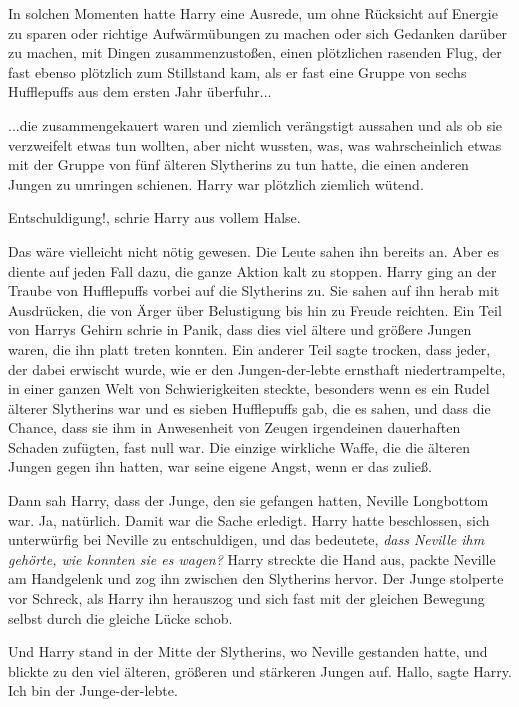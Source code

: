 In solchen Momenten hatte Harry eine Ausrede, um ohne Rücksicht auf Energie zu
sparen oder richtige Aufwärmübungen zu machen oder sich Gedanken darüber zu
machen, mit Dingen zusammenzustoßen, einen plötzlichen rasenden Flug, der fast
ebenso plötzlich zum Stillstand kam, als er fast eine Gruppe von sechs
Hufflepuffs aus dem ersten Jahr überfuhr...

...die zusammengekauert waren und ziemlich verängstigt aussahen und als ob sie
verzweifelt etwas tun wollten, aber nicht wussten, was, was wahrscheinlich etwas
mit der Gruppe von fünf älteren Slytherins zu tun hatte, die einen anderen
Jungen zu umringen schienen. Harry war plötzlich ziemlich wütend.

\glqq{}Entschuldigung!\grqq{}, schrie Harry aus vollem Halse.

Das wäre vielleicht nicht nötig gewesen. Die Leute sahen ihn bereits an. Aber es
diente auf jeden Fall dazu, die ganze Aktion kalt zu stoppen. Harry ging an der
Traube von Hufflepuffs vorbei auf die Slytherins zu. Sie sahen auf ihn herab mit
Ausdrücken, die von Ärger über Belustigung bis hin zu Freude reichten. Ein Teil
von Harrys Gehirn schrie in Panik, dass dies viel ältere und größere Jungen
waren, die ihn platt treten konnten. Ein anderer Teil sagte trocken, dass jeder,
der dabei erwischt wurde, wie er den Jungen-der-lebte ernsthaft niedertrampelte,
in einer ganzen Welt von Schwierigkeiten steckte, besonders wenn es ein Rudel
älterer Slytherins war und es sieben Hufflepuffs gab, die es sahen, und dass die
Chance, dass sie ihm in Anwesenheit von Zeugen irgendeinen dauerhaften Schaden
zufügten, fast null war. Die einzige wirkliche Waffe, die die älteren Jungen
gegen ihn hatten, war seine eigene Angst, wenn er das zuließ.

Dann sah Harry, dass der Junge, den sie gefangen hatten, Neville Longbottom war.
Ja, natürlich. Damit war die Sache erledigt. Harry hatte beschlossen, sich
unterwürfig bei Neville zu entschuldigen, und das bedeutete, \emph{dass Neville
ihm gehörte, wie konnten sie es wagen?} Harry streckte die Hand aus, packte
Neville am Handgelenk und zog ihn zwischen den Slytherins hervor. Der Junge
stolperte vor Schreck, als Harry ihn herauszog und sich fast mit der gleichen
Bewegung selbst durch die gleiche Lücke schob.

Und Harry stand in der Mitte der Slytherins, wo Neville gestanden hatte, und
blickte zu den viel älteren, größeren und stärkeren Jungen auf. \glqq
Hallo\grqq{}, sagte Harry. \glqq{}Ich bin der Junge-der-lebte.\grqq{}

